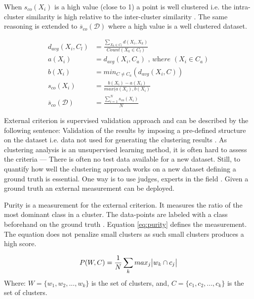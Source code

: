 \documentclass[a4paper,11pt]{article}
\begin{document}
When $s_{co}(X_i)$ is a high value (close to 1) a point is well clustered i.e. the intra-cluster similarity is high relative to the inter-cluster similarity \cite{ROUSSEEUW198753}. The same reasoning is extended to $\overline{s}_{co}(\mathcal{D})$ where a high value is a well clustered dataset.

\begin{align}
  d_{avg}(X_i,C_l) &= \frac{\sum_{X_k \in C_l}d(X_i,X_k)}{Count(X_k \in C_l)} \\
  a(X_i) &= d_{avg}(X_i,C_a) \textit{ , where } (X_i \in C_a) \\
  b(X_i) &= min_{C \neq C_a}(d_{avg}(X_i,C)) \\
 \label{eq:sil}
  s_{co}(X_i) &= \frac{b(X_i) - a(X_i)}{max(a(X_i), b(X_i)} \\
\label{eq:avg_s}
  \overline{s}_{co}(\mathcal{D}) &= \frac{\sum^{N}_{i=1} s_{co}(X_i)}{N}
\end{align}

External criterion is supervised validation approach and can be described by the following sentence: Validation of the results by imposing a pre-defined structure on the dataset i.e. data not used for generating the clustering results \cite{Halkidi2002}. As clustering analysis is an unsupervised learning method, it is often hard to assess the criteria --- There is often no test data available for a new dataset. Still, to quantify how well the clustering approach works on a new dataset defining a ground truth is essential. One way is to use judges, experts in the field \cite{manning2010introduction}. Given a ground truth an external measurement can be deployed.

Purity is a measurement for the external criterion. It measures the ratio of the most dominant class in a cluster. The data-points are labeled with a class beforehand on the ground truth \cite{manning2010introduction}. Equation \ref{eq:purity} defines the measurement. The equation does not penalize small clusters as such small clusters produces a high score.

\begin{equation}
  \label{eq:purity}
  P(W, C) = \frac{1}{N}\sum_{k}max_{j}\abs{w_k \cap c_j}
\end{equation}
Where:\newline
$W = \{w_1,w_2,...,w_k\}$ is the set of clusters, and,
$C = \{c_1,c_2,...,c_k\}$ is the set of clusters.
\end{document}
